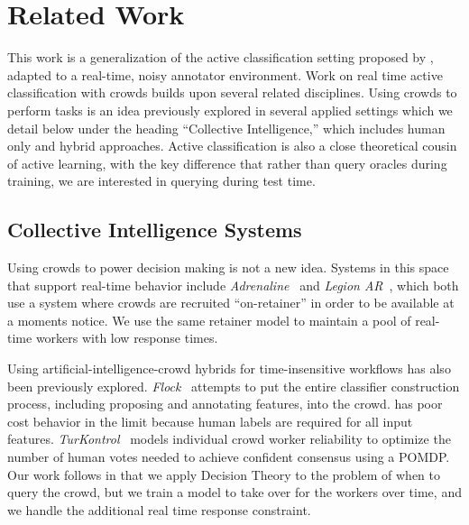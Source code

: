 \section{Related Work}
\label{sec:related}

This work is a generalization of the active classification setting proposed by \cite{greiner2002learning}, adapted to a real-time, noisy annotator environment.
Work on real time active classification with crowds builds upon several related disciplines.
Using crowds to perform tasks is an idea previously explored in several applied settings which we detail below under the heading ``Collective Intelligence,'' which includes human only and hybrid approaches.
Active classification is also a close theoretical cousin of active learning, with the key difference that rather than query oracles during training, we are interested in querying during test time.

\subsection{Collective Intelligence Systems}

Using crowds to power decision making is not a new idea. Systems in this space that support real-time behavior include \textit{Adrenaline}~\cite{bernstein2011crowds} and \textit{Legion AR}~\cite{lasecki2013real}, which both use a system where crowds are recruited ``on-retainer'' in order to be available at a moments notice.
We use the same retainer model to maintain a pool of real-time workers with low response times.

Using artificial-intelligence-crowd hybrids for time-insensitive workflows has also been previously explored.
\textit{Flock}~\cite{chengflock} attempts to put the entire classifier construction process, including proposing and annotating features, into the crowd. \cite{chengflock} has poor cost behavior in the limit because human labels are required for all input features.
\textit{TurKontrol}~\cite{peng2010decision} models individual crowd worker reliability to optimize the number of human votes needed to achieve confident consensus using a POMDP.
Our work follows \cite{peng2010decision} in that we apply Decision Theory to the problem of when to query the crowd, but we train a model to take over for the workers over time, and we handle the additional real time response constraint.

